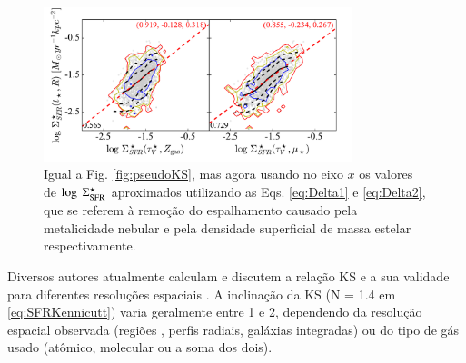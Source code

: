 \begin{figure}
	\centering
	\includegraphics[width=0.8\textwidth]{figuras/pseudoKS_noscat.pdf}
	\caption[A {\em pseudo-KS} sem os principais causadores de espalhamento]
	{Igual a Fig. \ref{fig:pseudoKS}, mas agora usando no eixo $x$ os valores de $\log\ \Sigma_{\mathrm{SFR}}^\star$
aproximados utilizando as Eqs. \ref{eq:Delta1} e \ref{eq:Delta2}, que se referem à remoção do
espalhamento causado pela metalicidade nebular e pela densidade superficial de massa estelar respectivamente.}
	\label{fig:pseudoKS_noscat}
\end{figure}


Diversos autores atualmente calculam e discutem a relação KS e a sua validade para diferentes
resoluções espaciais \citep[e.g., ][]{Kennicutt.etal.2007a, Leroy.etal.2012a,
Calzetti.Liu.Koda.2012a, Lada.etal.2013a, Tacconi.etal.2013a, Casasola.etal.2015a}. A inclinação
da KS (N = 1.4 em \eqref{eq:SFRKennicutt}) varia geralmente entre 1 e 2, dependendo da resolução
espacial observada (regiões \Hii, perfis radiais, galáxias integradas) ou do tipo de gás usado
(atômico, molecular ou a soma dos dois).

